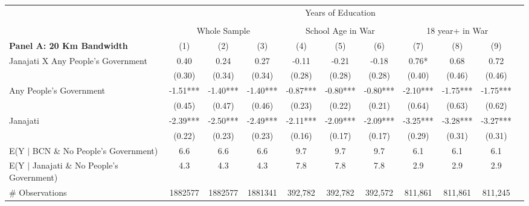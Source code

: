 \begin{tabular}{l*{10}{c}}
\toprule
\toprule
\addlinespace
& \multicolumn{9}{c}{Years of Education}       \\ 
\cline{2-9} \\[-1.8ex] 
& \multicolumn{3}{c}{Whole Sample} & \multicolumn{3}{c}{School Age in War} & \multicolumn{3}{c}{18 year+ in War} \\ 
\toprule
\addlinespace
\textbf{Panel A: 20 Km Bandwidth}
                    &\multicolumn{1}{c}{(1)}   &\multicolumn{1}{c}{(2)}   &\multicolumn{1}{c}{(3)}   &\multicolumn{1}{c}{(4)}   &\multicolumn{1}{c}{(5)}   &\multicolumn{1}{c}{(6)}   &\multicolumn{1}{c}{(7)}   &\multicolumn{1}{c}{(8)}   &\multicolumn{1}{c}{(9)}   \\
\midrule
Janajati X Any People's Government&        0.40   &        0.24   &        0.27   &       -0.11   &       -0.21   &       -0.18   &        0.76*  &        0.68   &        0.72   \\
                    &      (0.30)   &      (0.34)   &      (0.34)   &      (0.28)   &      (0.28)   &      (0.28)   &      (0.40)   &      (0.46)   &      (0.46)   \\
Any People's Government&       -1.51***&       -1.40***&       -1.40***&       -0.87***&       -0.80***&       -0.80***&       -2.10***&       -1.75***&       -1.75***\\
                    &      (0.45)   &      (0.47)   &      (0.46)   &      (0.23)   &      (0.22)   &      (0.21)   &      (0.64)   &      (0.63)   &      (0.62)   \\
Janajati            &       -2.39***&       -2.50***&       -2.49***&       -2.11***&       -2.09***&       -2.09***&       -3.25***&       -3.28***&       -3.27***\\
                    &      (0.22)   &      (0.23)   &      (0.23)   &      (0.16)   &      (0.17)   &      (0.17)   &      (0.29)   &      (0.31)   &      (0.31)   \\
\midrule
E(Y $|$ BCN \& No People's Government)&         6.6   &         6.6   &         6.6   &         9.7   &         9.7   &         9.7   &         6.1   &         6.1   &         6.1   \\
E(Y $|$ Janajati \& No People's Government)&         4.3   &         4.3   &         4.3   &         7.8   &         7.8   &         7.8   &         2.9   &         2.9   &         2.9   \\
\# Observations     &     1882577   &     1882577   &     1881341   &     392,782   &     392,782   &     392,572   &     811,861   &     811,861   &     811,245   \\

\end{tabular}
